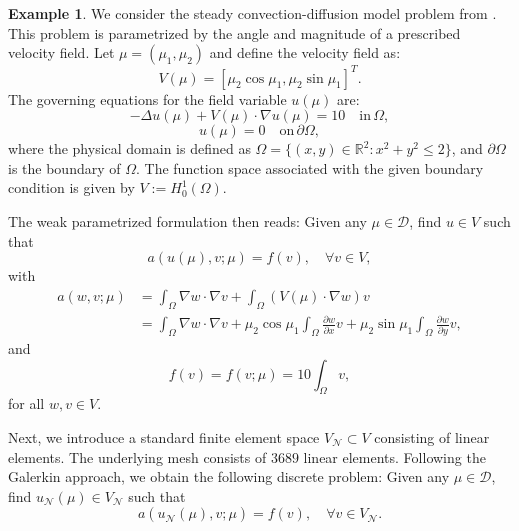 \documentclass[12pt]{article}
\theoremstyle{remark}
\theoremstyle{definition}
\newtheorem{exmp}{Example}[section]
\numberwithin{equation}{section}
\begin{document}
\begin{exmp}
\label{transport}
We consider the steady convection-diffusion model problem from \cite{eftang2010hp}. This problem is parametrized by the angle and magnitude of a prescribed velocity field. Let $\mu = (\mu_1, \mu_2)$ and define the velocity field as:
\begin{equation}
V(\mu) = [\mu_2 \cos \mu_1, \mu_2 \sin \mu_1]^T.
\end{equation}
The governing equations for the field variable $u(\mu)$ are:
\begin{equation}
-\Delta u(\mu) + V(\mu) \cdot \nabla u(\mu) = 10 \quad \text{in} \, \Omega,
\end{equation}
\begin{equation}
u(\mu) = 0 \quad \text{on} \, \partial \Omega,
\end{equation}
where the physical domain is defined as $\Omega = \{(x, y) \in \mathbb{R}^2 : x^2 + y^2 \leq 2\}$, and $\partial \Omega$ is the boundary of $\Omega$.
The function space associated with the given boundary condition is given by $ V := H_0^1(\Omega)$.

The weak parametrized formulation then reads: Given any $\mu \in \mathcal{D}$, find $u \in V$ such that
\begin{equation}
a(u(\mu), v; \mu) = f(v), \quad \forall v \in V,
\end{equation}
with 
\begin{align}
a(w, v; \mu) &= \int_{\Omega} \nabla w \cdot \nabla v   + \int_{\Omega} (V(\mu) \cdot \nabla w) v\\
&= \int_{\Omega} \nabla w \cdot \nabla v + \mu_2 \cos \mu_1 \int_{\Omega} \frac{\partial w}{\partial x} v + \mu_2 \sin \mu_1 \int_{\Omega} \frac{\partial w}{\partial y} v ,
\end{align}
and 
\begin{equation}
f(v) = f(v; \mu) = 10 \int_{\Omega} v ,
\end{equation}
for all $w, v \in V$.
\end{exmp}

Next, we introduce a standard finite element space $V_{\mathcal{N}}\subset V$ consisting of linear elements. The underlying mesh consists of $3689$ linear elements. Following the Galerkin approach, we obtain the following discrete problem: Given any $\mu \in \mathcal{D}$, find $u_{\mathcal{N}}(\mu) \in V_{\mathcal{N}}$ such that
\begin{equation}
a(u_{\mathcal{N}}(\mu), v; \mu) = f(v), \quad \forall v \in V_{\mathcal{N}}.
\label{FE prob}
\end{equation}
\end{document}
